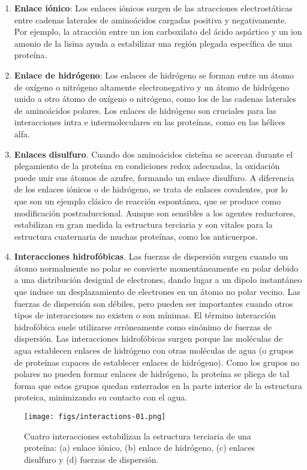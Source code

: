 \begin{enumerate}
\item \textbf{Enlace iónico}: Los enlaces iónicos surgen de las atracciones electrostáticas entre cadenas laterales de aminoácidos cargadas positiva y negativamente. Por ejemplo, la atracción entre un ion carboxilato del ácido aspártico y un ion amonio de la lisina ayuda a estabilizar una región plegada específica de una proteína.
\item \textbf{Enlace de hidrógeno}: Los enlaces de hidrógeno se forman entre un átomo de oxígeno o nitrógeno altamente electronegativo y un átomo de hidrógeno unido a otro átomo de oxígeno o nitrógeno, como los de las cadenas laterales de aminoácidos polares. Los enlaces de hidrógeno son cruciales para las interacciones intra e intermoleculares en las proteínas, como en las hélices alfa.
\item \textbf{Enlaces disulfuro}. Cuando dos aminoácidos cisteína se acercan durante el plegamiento de la proteína en condiciones redox adecuadas, la oxidación puede unir sus átomos de azufre, formando un enlace disulfuro. A diferencia de los enlaces iónicos o de hidrógeno, se trata de enlaces covalentes, por lo que son un ejemplo clásico de reacción espontánea, que se produce como modificación postraduccional. Aunque son sensibles a los agentes reductores, estabilizan en gran medida la estructura terciaria y son vitales para la estructura cuaternaria de muchas proteínas, como los anticuerpos.
\item \textbf{Interacciones hidrofóbicas}. Las fuerzas de dispersión surgen cuando un átomo normalmente no polar se convierte momentáneamente en polar debido a una distribución desigual de electrones, dando lugar a un dipolo instantáneo que induce un desplazamiento de electrones en un átomo no polar vecino. Las fuerzas de dispersión son débiles, pero pueden ser importantes cuando otros tipos de interacciones no existen o son mínimas. El término interacción hidrofóbica suele utilizarse erróneamente como sinónimo de fuerzas de dispersión. Las interacciones hidrofóbicas surgen porque las moléculas de agua establecen enlaces de hidrógeno con otras moléculas de agua (o grupos de proteínas capaces de establecer enlaces de hidrógeno). Como los grupos no polares no pueden formar enlaces de hidrógeno, la proteína se pliega de tal forma que estos grupos quedan enterrados en la parte interior de la estructura proteica, minimizando su contacto con el agua.
\end{enumerate}

\begin{figure}[h]
\centering
\texttt{[image: figs/interactions-01.png]}
\caption{Cuatro interacciones estabilizan la estructura terciaria de una proteína: (a) enlace iónico, (b) enlace de hidrógeno, (c) enlaces disulfuro y (d) fuerzas de dispersión.}
\label{fig:interactions}
\end{figure}


